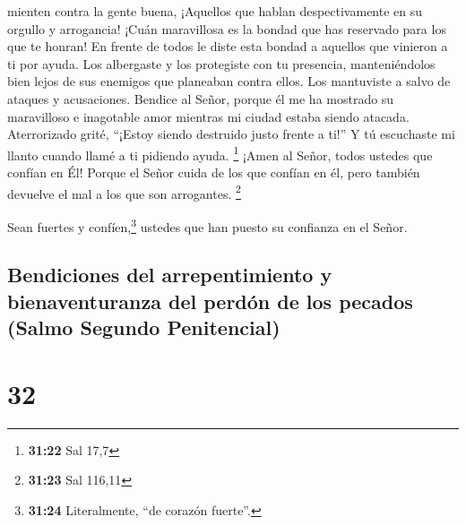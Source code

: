 mienten contra la gente buena, ¡Aquellos que hablan despectivamente en
su orgullo y arrogancia!  ¡Cuán maravillosa es la bondad
que has reservado para los que te honran! En frente de todos le diste
esta bondad a aquellos que vinieron a ti por ayuda.  Los
albergaste y los protegiste con tu presencia, manteniéndolos bien lejos
de sus enemigos que planeaban contra ellos. Los mantuviste a salvo de
ataques y acusaciones.  Bendice al Señor, porque él me ha
mostrado su maravilloso e inagotable amor mientras mi ciudad estaba
siendo atacada.  Aterrorizado grité, ``¡Estoy siendo
destruido justo frente a ti!'' Y tú escuchaste mi llanto cuando llamé a
ti pidiendo ayuda. \footnote{\textbf{31:22} Sal 17,7} 
¡Amen al Señor, todos ustedes que confían en Él! Porque el Señor cuida
de los que confían en él, pero también devuelve el mal a los que son
arrogantes. \footnote{\textbf{31:23} Sal 116,11}

 Sean fuertes y confíen,\footnote{\textbf{31:24}
  Literalmente, ``de corazón fuerte''.} ustedes que han puesto su
confianza en el Señor.

\hypertarget{bendiciones-del-arrepentimiento-y-bienaventuranza-del-perduxf3n-de-los-pecados-salmo-segundo-penitencial}{%
\subsection{Bendiciones del arrepentimiento y bienaventuranza del perdón
de los pecados (Salmo Segundo
Penitencial)}\label{bendiciones-del-arrepentimiento-y-bienaventuranza-del-perduxf3n-de-los-pecados-salmo-segundo-penitencial}}

\hypertarget{section-31}{%
\section{32}\label{section-31}}


